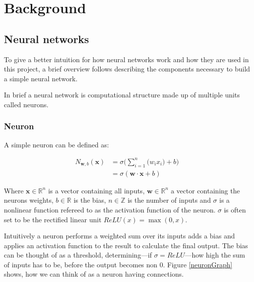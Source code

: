 
\newcommand{\neuronSum}[1][n]{
	\sigma\Bigg(\sum_{i=1}^{#1}{\Big(w_i x_i\Big)} + b\Bigg)
}

\chapter{Background}
\section{Neural networks}
To give a better intuition for how neural networks work and how they are used in this project, a brief overview follows describing the components necessary to build a simple neural network.

In brief a neural network is computational structure made up of multiple units called neurons.


\subsection{Neuron}
A simple neuron can be defined as:

\begin{equation}
\begin{split}
	N_{\bm w, b}(\bm{x}) & = \neuronSum[n] \\
 	& = \sigma (\bm{w} \cdot \bm{x} + b)
\end{split}
\end{equation}

Where $\bm{x} \in \mathbb{R}^n$ is a vector containing all inputs, $ \bm{w} \in \mathbb{R}^n$ a vector containing the neurons weights, $b \in \mathbb{R}$ is the bias, $n \in \mathbb{Z}$ is the number of inputs and $\sigma$ is a nonlinear function refereed to as the activation function of the neuron. $\sigma$ is often set to be the rectified linear unit $ReLU(x) = \max(0, x)$.

Intuitively a neuron performs a weighted sum over its inputs adds a bias and applies an activation function to the result to calculate the final output. The bias can be thought of as a threshold, determining---if $\sigma = ReLU$---how high the sum of inputs has to be, before the output becomes non 0. Figure \ref{neuronGraph} shows, how we can think of as a neuron having connections.

\neuronGraph{p}{$\displaystyle{\neuronSum[3]}$}


